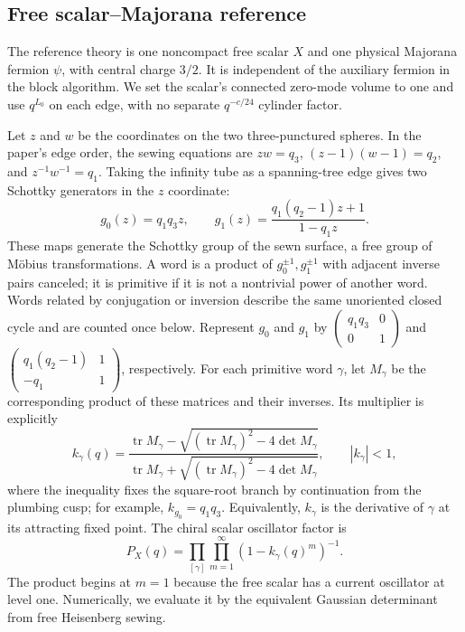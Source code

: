 \subsection{Free scalar--Majorana reference}

The reference theory is one noncompact free scalar $X$ and one
physical Majorana fermion $\psi$, with central charge $3/2$. It is
independent of the auxiliary fermion in the block algorithm. We set
the scalar's connected zero-mode volume to one and use $q^{L_0}$ on
each edge, with no separate $q^{-c/24}$ cylinder factor.

Let $z$ and $w$ be the coordinates on the two three-punctured
spheres. In the paper's edge order, the sewing equations are
$zw=q_3$, $(z-1)(w-1)=q_2$, and
$z^{-1}w^{-1}=q_1$. Taking the infinity tube as a spanning-tree
edge gives two Schottky generators in the $z$ coordinate:
\begin{equation}
 g_0(z)=q_1q_3z,\qquad
 g_1(z)=\frac{q_1(q_2-1)z+1}{1-q_1z}.
 \label{eq:partition-free-schottky-generators}
\end{equation}
These maps generate the Schottky group of the sewn surface, a free
group of M\"obius transformations. A word is a product of
$g_0^{\pm1},g_1^{\pm1}$ with adjacent inverse pairs canceled; it is
primitive if it is not a nontrivial power of another word. Words
related by conjugation or inversion describe the same unoriented
closed cycle and are counted once below.
Represent $g_0$ and $g_1$ by
$\left(\begin{smallmatrix}q_1q_3&0\\0&1\end{smallmatrix}\right)$
and
$\left(\begin{smallmatrix}q_1(q_2-1)&1\\-q_1&1\end{smallmatrix}\right)$,
respectively. For each primitive word $\gamma$,
let $M_\gamma$ be the corresponding product of these matrices and
their inverses. Its multiplier is explicitly
\begin{equation}
 k_\gamma(q)=
 \frac{\operatorname{tr}M_\gamma-
  \sqrt{(\operatorname{tr}M_\gamma)^2-4\det M_\gamma}}
 {\operatorname{tr}M_\gamma+
  \sqrt{(\operatorname{tr}M_\gamma)^2-4\det M_\gamma}},
 \qquad |k_\gamma|<1,
 \label{eq:partition-free-multiplier}
\end{equation}
where the inequality fixes the square-root branch by continuation
from the plumbing cusp; for example, $k_{g_0}=q_1q_3$. Equivalently,
$k_\gamma$ is the derivative of $\gamma$ at its attracting fixed
point. The chiral scalar oscillator factor is
\begin{equation}
 P_X(q)=\prod_{[\gamma]}\prod_{m=1}^{\infty}
                   (1-k_\gamma(q)^m)^{-1}.
 \label{eq:partition-free-boson-product}
\end{equation}
The product begins at $m=1$ because the free scalar has a current
oscillator at level one. Numerically, we evaluate it by the equivalent
Gaussian determinant from free Heisenberg sewing.

